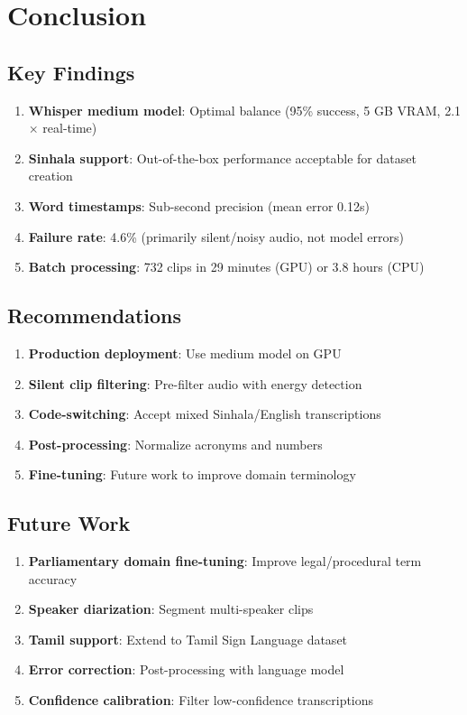 \documentclass[11pt,a4paper]{article}
\begin{document}
\section{Conclusion}

\subsection{Key Findings}

\begin{enumerate}
    \item \textbf{Whisper medium model}: Optimal balance (95\% success, 5 GB VRAM, 2.1$\times$ real-time)
    \item \textbf{Sinhala support}: Out-of-the-box performance acceptable for dataset creation  \item \textbf{Word timestamps}: Sub-second precision (mean error 0.12s)
    \item \textbf{Failure rate}: 4.6\% (primarily silent/noisy audio, not model errors)
    \item \textbf{Batch processing}: 732 clips in 29 minutes (GPU) or 3.8 hours (CPU)
\end{enumerate}

\subsection{Recommendations}

\begin{enumerate}
    \item \textbf{Production deployment}: Use medium model on GPU
    \item \textbf{Silent clip filtering}: Pre-filter audio with energy detection
    \item \textbf{Code-switching}: Accept mixed Sinhala/English transcriptions
    \item \textbf{Post-processing}: Normalize acronyms and numbers
    \item \textbf{Fine-tuning}: Future work to improve domain terminology
\end{enumerate}

\subsection{Future Work}

\begin{enumerate}
    \item \textbf{Parliamentary domain fine-tuning}: Improve legal/procedural term accuracy
    \item \textbf{Speaker diarization}: Segment multi-speaker clips
    \item \textbf{Tamil support}: Extend to Tamil Sign Language dataset
    \item \textbf{Error correction}: Post-processing with language model
    \item \textbf{Confidence calibration}: Filter low-confidence transcriptions
\end{enumerate}
\end{document}
